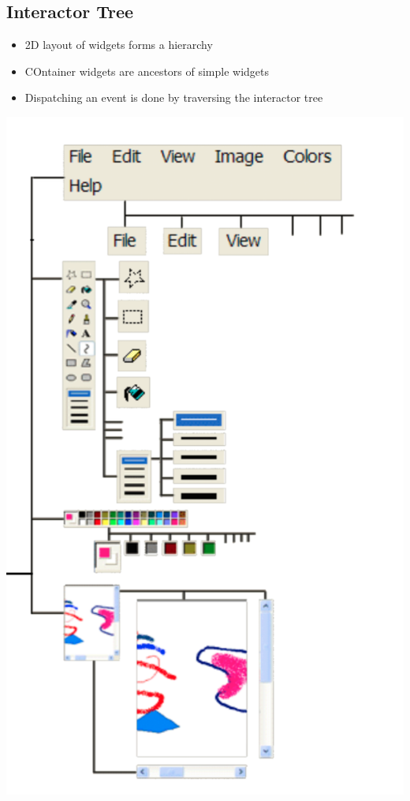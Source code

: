 \documentclass[twoside]{article}
\begin{document}
\subsection{Interactor Tree}
\begin{itemize}
\item 2D layout of widgets forms a hierarchy 
\item COntainer widgets are ancestors of simple widgets 
\item Dispatching an event is done by traversing the interactor tree 
\end{itemize}

\begin{center}
\includegraphics[scale=0.4]{25}
\end{center}
\end{document}
